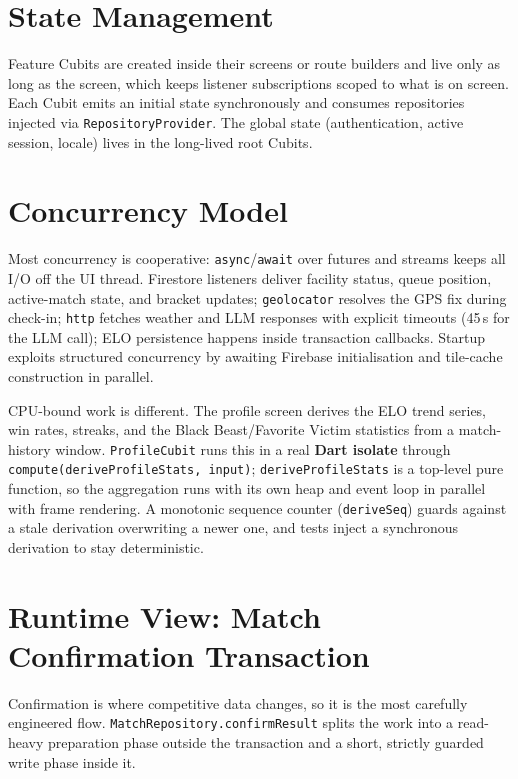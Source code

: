 \documentclass{configurations/polimi3i_thesis}
\renewcommand{\_}{\textunderscore\allowbreak}
\begin{document}
\section{State Management}
Feature Cubits are created inside their screens or route builders and live only as long as the screen, which keeps listener subscriptions scoped to what is on screen. Each Cubit emits an initial state synchronously and consumes repositories injected via \texttt{RepositoryProvider}. The global state (authentication, active session, locale) lives in the long-lived root Cubits.

\section{Concurrency Model}
\label{sec:concurrency}
Most concurrency is cooperative: \texttt{async}/\texttt{await} over futures and streams keeps all I/O off the UI thread. Firestore listeners deliver facility status, queue position, active-match state, and bracket updates; \texttt{geolocator} resolves the GPS fix during check-in; \texttt{http} fetches weather and LLM responses with explicit timeouts (45\,s for the LLM call); ELO persistence happens inside transaction callbacks. Startup exploits structured concurrency by awaiting Firebase initialisation and tile-cache construction in parallel.

CPU-bound work is different. The profile screen derives the ELO trend series, win rates, streaks, and the Black Beast/Favorite Victim statistics from a match-history window. \texttt{ProfileCubit} runs this in a real \textbf{Dart isolate} through \texttt{compute(deriveProfileStats, input)}; \texttt{deriveProfileStats} is a top-level pure function, so the aggregation runs with its own heap and event loop in parallel with frame rendering. A monotonic sequence counter (\texttt{\_deriveSeq}) guards against a stale derivation overwriting a newer one, and tests inject a synchronous derivation to stay deterministic.

\section{Runtime View: Match Confirmation Transaction}
\label{sec:confirm_txn}
Confirmation is where competitive data changes, so it is the most carefully engineered flow. \texttt{MatchRepository.confirmResult} splits the work into a read-heavy preparation phase outside the transaction and a short, strictly guarded write phase inside it.
\end{document}
